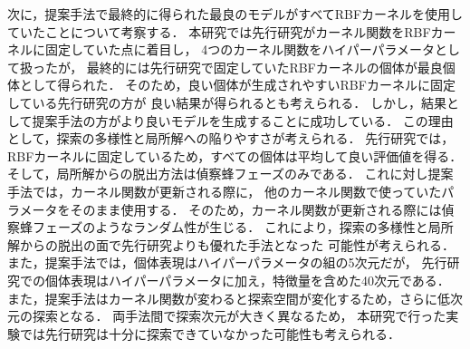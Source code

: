 次に，提案手法で最終的に得られた最良のモデルがすべてRBFカーネルを使用していたことについて考察する．
本研究では先行研究がカーネル関数をRBFカーネルに固定していた点に着目し，
4つのカーネル関数をハイパーパラメータとして扱ったが，
最終的には先行研究で固定していたRBFカーネルの個体が最良個体として得られた．
そのため，良い個体が生成されやすいRBFカーネルに固定している先行研究の方が
良い結果が得られるとも考えられる．
しかし，結果として提案手法の方がより良いモデルを生成することに成功している．
この理由として，探索の多様性と局所解への陥りやすさが考えられる．
先行研究では，RBFカーネルに固定しているため，すべての個体は平均して良い評価値を得る．
そして，局所解からの脱出方法は偵察蜂フェーズのみである．
これに対し提案手法では，カーネル関数が更新される際に，
他のカーネル関数で使っていたパラメータをそのまま使用する．
そのため，カーネル関数が更新される際には偵察蜂フェーズのようなランダム性が生じる．
これにより，探索の多様性と局所解からの脱出の面で先行研究よりも優れた手法となった
可能性が考えられる．
また，提案手法では，個体表現はハイパーパラメータの組の5次元だが，
先行研究での個体表現はハイパーパラメータに加え，特徴量を含めた40次元である．
また，提案手法はカーネル関数が変わると探索空間が変化するため，さらに低次元の探索となる．
両手法間で探索次元が大きく異なるため，
本研究で行った実験では先行研究は十分に探索できていなかった可能性も考えられる．